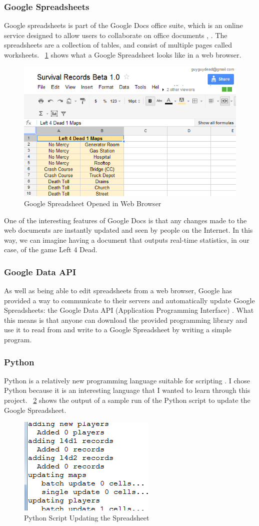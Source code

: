 \subsubsection{Google Spreadsheets}
Google spreadsheets is part of the Google Docs office suite, which is an online service designed to allow users to collaborate on office documents \cite{web:google_spreadsheets}, \cite{web:google_docs}. The spreadsheets are a collection of tables, and consist of multiple pages called worksheets. \figurename\ \ref{fig:sample1} shows what a Google Spreadsheet looks like in a web browser.
\begin{figure}[htb!]
\centering
\includegraphics[width=0.40\columnwidth]{sample_screen_1}
\caption{Google Spreadsheet Opened in Web Browser}
\label{fig:sample1}
\end{figure}

One of the interesting features of Google Docs is that any changes made to the web documents are instantly updated and seen by people on the Internet. In this way, we can imagine having a document that outputs real-time statistics, in our case, of the game Left 4 Dead.

\subsubsection{Google Data API}
As well as being able to edit spreadsheets from a web browser, Google has provided a way to communicate to their servers and automatically update Google Spreadsheets: the Google Data API (Application Programming Interface) \cite{web:google_api}. What this means is that anyone can download the provided programming library and use it to read from and write to a Google Spreadsheet by writing a simple program.

\subsubsection{Python}
Python is a relatively new programming language suitable for scripting \cite{web:python}. I chose Python because it is an interesting language that I wanted to learn through this project. \figurename\ \ref{fig:sample2} shows the output of a sample run of the Python script to update the Google Spreadsheet.
\begin{figure}[htb!]
\centering
\includegraphics[width=0.30\columnwidth]{sample_screen_2}
\caption{Python Script Updating the Spreadsheet}
\label{fig:sample2}
\end{figure}
